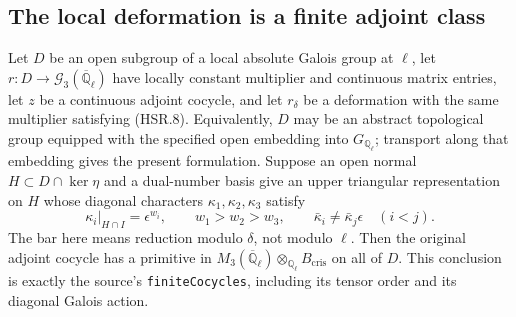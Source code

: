 \subsection{The local deformation is a finite adjoint class}

\begin{proposition}
\label{claim:HSR5}
Let $D$ be an open subgroup of a local absolute Galois group at
$\ell$, let $r:D\to\mathcal G_3(\overline{\mathbb Q}_\ell)$
have locally constant multiplier and continuous matrix entries,
let $z$ be a continuous adjoint cocycle, and let $r_\delta$ be a
deformation with the same multiplier satisfying (HSR.8).
Equivalently, $D$ may be an abstract topological group equipped
with the specified open embedding into $G_{\mathbb Q_\ell}$;
transport along that embedding gives the present formulation.
Suppose an open normal
$H\subset D\cap\ker\eta$ and a dual-number basis give an upper
triangular representation on $H$ whose diagonal characters
$\kappa_1,\kappa_2,\kappa_3$ satisfy
\[
 \kappa_i|_{H\cap I}=\epsilon^{w_i},\qquad
 w_1>w_2>w_3,
 \qquad \bar\kappa_i\ne\bar\kappa_j\epsilon\quad(i<j).
 \tag{HSR.18}
\]
The bar here means reduction modulo $\delta$, not modulo $\ell$.
Then the original adjoint cocycle has a primitive in
$M_3(\overline{\mathbb Q}_\ell)\otimes_{\mathbb Q_\ell}
B_{\mathrm{cris}}$ on all of $D$.  This conclusion is exactly
the source's \texttt{finiteCocycles}, including its tensor order
and its diagonal Galois action.
\end{proposition}
